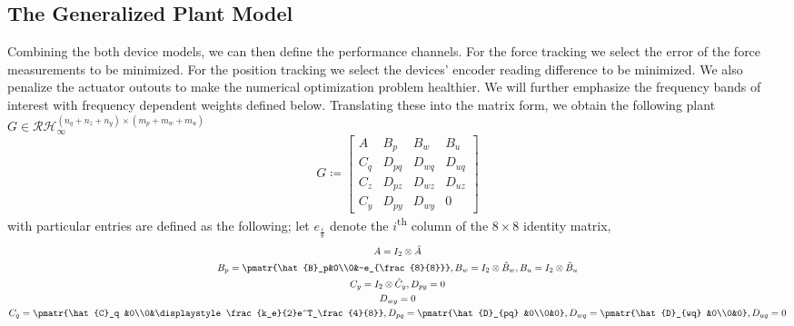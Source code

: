 \subsection{The Generalized Plant Model}
Combining the both device models, we can then define the performance channels. For the force tracking we select the error of 
the force measurements to be minimized. For the position tracking we select the devices' encoder reading difference to be 
minimized. We also penalize the actuator outouts to make the numerical optimization problem healthier. We will further emphasize 
the frequency bands of interest with frequency dependent weights defined below. Translating these into 
the matrix form, we obtain the following plant $G\in\mathcal{RH}_\infty^{(n_q+n_z+n_y)\times(m_p+m_w+m_u)}$
\begin{equation}
G \coloneqq \left[
\begin{array}{c|ccc}
	A    &B_p    &B_w    &B_u\\\hline
	C_q  &D_{pq} &D_{wq} &D_{uq}\\
	C_z  &D_{pz} &D_{wz} &D_{uz}\\
	C_y  &D_{py} &D_{wy} &0
\end{array}
\right]
\label{eq:app:genplantsymb}
\end{equation}
with particular entries are defined as the following; let $e_\frac{i}{8}$ denote the 
$i$\textsuperscript{th} column of the $8\times 8$ identity matrix,
\begin{gather*}
A      = I_2\otimes\hat{A}  \\
B_p    = \pmatr{\hat{B}_p&0\\0&-e_{\frac{8}{8}}},
B_w    = I_2\otimes\hat{B}_w,
B_u    = I_2\otimes\hat{B}_u\\
C_y    = I_2\otimes\hat{C}_y,
D_{py} = 0\\%
D_{wy} = 0\\%
C_q    =\pmatr{\hat{C}_q &0\\0&\displaystyle\frac{k_e}{2}e^T_\frac{4}{8}},
D_{pq} = \pmatr{\hat{D}_{pq} &0\\0&0},
D_{wq} = \pmatr{\hat{D}_{wq} &0\\0&0},
D_{uq} = 0\\%
\end{gather*}
